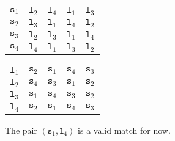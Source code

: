 \documentclass[a4paper, openany]{memoir}
\begin{document}
    \begin{table}[H]
        \centering
        \begin{subtable}{0.45\textwidth}
            \centering
            \begin{tabular}{c|cccc}
                $\texttt{s}_1$ & {\color{gray} $\texttt{l}_2$} & \underline{$\texttt{l}_4$} & $\texttt{l}_1$ & $\texttt{l}_3$ \\
                $\texttt{s}_2$ & \underline{$\texttt{l}_3$} & $\texttt{l}_1$ & $\texttt{l}_4$ & $\texttt{l}_2$ \\
                $\texttt{s}_3$ & \underline{$\texttt{l}_2$} & $\texttt{l}_3$ & $\texttt{l}_1$ & $\texttt{l}_4$ \\
                $\texttt{s}_4$ & $\texttt{l}_4$ & $\texttt{l}_1$ & $\texttt{l}_3$ & $\texttt{l}_2$
            \end{tabular}
        \end{subtable}
        \hfill
        \begin{subtable}{0.45\textwidth}
            \centering
            \begin{tabular}{c|cccc}
                $\texttt{l}_1$ & $\texttt{s}_2$ & $\texttt{s}_1$ & $\texttt{s}_4$ & $\texttt{s}_3$ \\
                $\texttt{l}_2$ & $\texttt{s}_4$ & \underline{$\texttt{s}_3$} & $\texttt{s}_1$ & $\texttt{s}_2$ \\
                $\texttt{l}_3$ & $\texttt{s}_1$ & $\texttt{s}_4$ & $\texttt{s}_3$ & \underline{$\texttt{s}_2$} \\
                $\texttt{l}_4$ & $\texttt{s}_2$ & \underline{$\texttt{s}_1$} & $\texttt{s}_4$ & $\texttt{s}_3$
            \end{tabular}
        \end{subtable}
    \end{table}
    \noindent The pair $(\texttt{s}_1, \texttt{l}_4)$ is a valid match for now.
\end{document}
